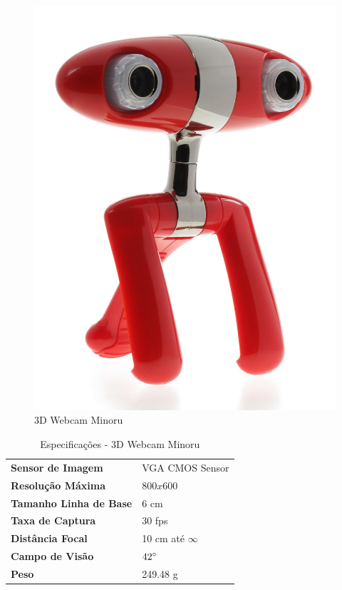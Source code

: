 \begin{figure}[H]
	\centering
	\includegraphics[scale=0.10]{./Resources/minoru.jpg}
	\caption{3D Webcam Minoru}
	\label{minoru}
\end{figure}

\begin{table}[]
\centering
\caption{Especificações - 3D Webcam Minoru}
\label{minoru_tab}
\begin{tabular}{ll}
\textbf{Sensor de Imagem}      & VGA CMOS Sensor  	\\
\textbf{Resolução Máxima}      & $800x600$        	\\
\textbf{Tamanho Linha de Base} & 6 cm             	\\
\textbf{Taxa de Captura}       & 30 fps             	\\
\textbf{Distância Focal}       & 10 cm até $\infty$	\\
\textbf{Campo de Visão}        & $42\degree$		   	\\
\textbf{Peso}				  & 249.48 g				\\
\end{tabular}
\end{table}

